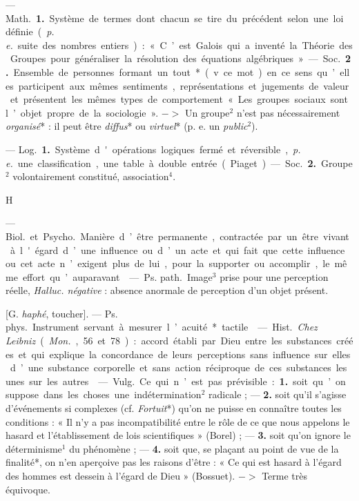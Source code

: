 \begin{itemize}[leftmargin=1cm, label=, itemsep=1pt]
 — \si{Math.} {\bf 1.} Système de termes dont chacun se tire du
précédent selon une loi définie ({\it p. e.} suite des nombres entiers) :
« C’est Galois qui a inventé la Théorie des Groupes pour généraliser la
résolution des équations algébriques. » — \si{Soc.} {\bf 2.} Ensemble de
personnes formant un tout* (v. ce mot) en ce sens qu’elles participent aux
mêmes sentiments, représentations et jugements de valeur et présentent les
mêmes types de comportement « Les groupes sociaux sont l’objet propre de la
sociologie ». $->$ Un groupe$^2$ n'est pas nécessairement {\it organisé}* :
il peut être {\it diffus}* ou {\it virtuel}* (p. e. un {\it public}$^2$).

 — \si{Log.} {\bf 1.} Système d'opérations logiques fermé
et réversible, {\it p. e.} une classification, une table à double entrée (Piaget).

— \si{Soc.} {\bf 2.} Groupe$^2$ volontairement constitué, association$^4$.

\begin{center}
\huge{H}
\end{center}

 — \si{Biol.} et \si{Psycho.} Manière d’être permanente,
contractée par un être vivant à l'égard d’une influence ou d’un acte et qui
fait que cette influence ou cet acte n’exigent plus de lui, pour la supporter
ou accomplir, le même effort qu’auparavant.

 — \si{Ps. path.} Image$^3$ prise pour une perception
réelle, {\it Halluc. négative} : absence anormale de perception d’un objet
présent.

 [G. {\it haphé}, toucher]. — \si{Ps. phys.}
Instrument servant à mesurer l’acuité* tactile.

 — \si{Hist.} {\it Chez Leibniz} ({\it Mon.}, 56 et
78) : accord établi par Dieu entre les substances créées et qui explique la
concordance de leurs perceptions sans influence sur elles d’une substance
corporelle et sans action réciproque de ces substances les unes sur les
autres.

 — \si{Vulg.} Ce qui n’est pas prévisible : {\bf 1.} soit qu’on
suppose dans les choses une indétermination$^2$ radicale ; — {\bf 2.} soit
qu'il s'agisse d'événements si complexes (cf. {\it Fortuit}*) qu’on ne puisse
en connaître toutes les conditions : « Il n’y a pas incompatibilité entre le
rôle de ce que nous appelons le hasard et l’établissement de lois
scientifiques » (Borel) ; — {\bf 3.} soit qu’on ignore le déterminisme$^1$ du
phénomène ; — {\bf 4.} soit que, se plaçant au point de vue de la finalité*,
on n’en aperçoive
pas les raisons d’être : « Ce qui est hasard à l’égard des hommes
est dessein à l'égard de Dieu » (Bossuet). $->$ Terme très équivoque.


\end{itemize}
